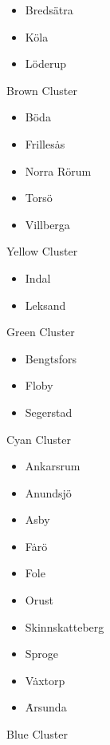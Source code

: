 \begin{figure}
\begin{itemize}
\item Breds\"atra
\item K\"ola
\item L\"oderup
\end{itemize}
\caption{Brown Cluster}
\label{brown-cluster}
\end{figure}

\begin{figure}
\begin{itemize}
\item B\"oda
\item Frilles\.as
\item Norra R\"orum
\item Tors\"o
\item Villberga
\end{itemize}
\caption{Yellow Cluster}
\label{yellow-cluster}
\end{figure}

\begin{figure}
\begin{itemize}
\item Indal
\item Leksand
\end{itemize}
\caption{Green Cluster}
\label{green-cluster}
\end{figure}

\begin{figure}
\begin{itemize}
\item Bengtsfors
\item Floby
\item Segerstad
\end{itemize}
\caption{Cyan Cluster}
\label{cyan-cluster}
\end{figure}

\begin{figure}
\begin{itemize}
\item Ankarsrum
\item Anundsj\"o
\item Asby
\item F\.ar\"o
\item Fole
\item Orust
\item Skinnskatteberg
\item Sproge
\item V\.axtorp
\item \.Arsunda
\end{itemize}
\caption{Blue Cluster}
\label{blue-cluster}
\end{figure}

